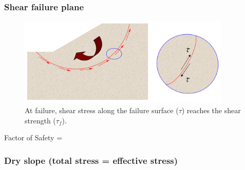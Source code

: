 \documentclass[notes]{beamer}
\begin{document}
\begin{frame}
\frametitle{Shear failure plane}
\begin{figure}[ht]
	\centering
	\includegraphics[width=0.9\textwidth]{figs/shear-failure-plane.png}
	\caption*{At failure, shear stress along the failure surface ($\tau$) reaches the shear strength ($\tau_f$).}
\end{figure}
Factor of Safety = 
\end{frame}

\begin{frame}
\frametitle{Dry slope (total stress = effective stress)}
\end{frame}
\end{document}
